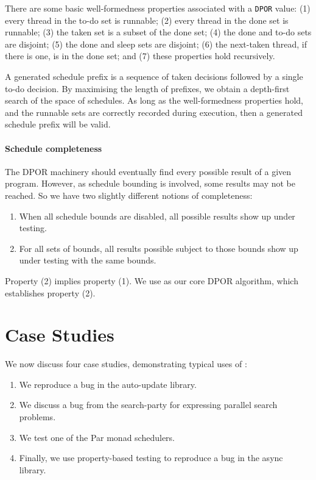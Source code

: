 There are some basic well-formedness properties associated with a
\verb|DPOR| value: (1) every thread in the to-do set is runnable; (2)
every thread in the done set is runnable; (3) the taken set is a
subset of the done set; (4) the done and to-do sets are disjoint; (5)
the done and sleep sets are disjoint; (6) the next-taken thread, if
there is one, is in the done set; and (7) these properties hold
recursively.

A generated schedule prefix is a sequence of taken decisions followed
by a single to-do decision.  By maximising the length of prefixes, we
obtain a depth-first search of the space of schedules.  As long as the
well-formedness properties hold, and the runnable sets are correctly
recorded during execution, then a generated schedule prefix will be
valid.

\paragraph{Schedule completeness}
The DPOR machinery should eventually find every possible result of a
given program.  However, as schedule bounding is involved, some
results may not be reached.  So we have two slightly different notions
of completeness:

\begin{enumerate}
\item When all schedule bounds are disabled, all possible results show
  up under testing.
\item For all sets of bounds, all results possible subject to those
  bounds show up under testing with the same bounds.
\end{enumerate}

Property (2) implies property (1).  We use \cite{coons2013} as our
core DPOR algorithm, which establishes property (2).

\section{Case Studies}
\label{sec:dejafu-casestudies}

We now discuss four case studies, demonstrating typical uses of
\dejafu{}:

\begin{enumerate}
\item We reproduce a bug in the auto-update\cite{auto_update} library.
\item We discuss a bug from the search-party\cite{search_party} for
  expressing parallel search problems.
\item We test one of the Par monad\cite{marlow2011} schedulers.
\item Finally, we use property-based testing to reproduce a bug in the
  async\cite{async} library.
\end{enumerate}

